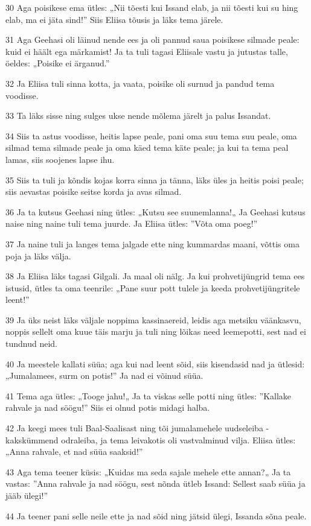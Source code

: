 \par 30 Aga poisikese ema ütles: „Nii tõesti kui Issand elab, ja nii tõesti kui su hing elab, ma ei jäta sind!” Siis Eliisa tõusis ja läks tema järele.
\par 31 Aga Geehasi oli läinud nende ees ja oli pannud saua poisikese silmade peale: kuid ei häält ega märkamist! Ja ta tuli tagasi Eliisale vastu ja jutustas talle, öeldes: „Poisike ei ärganud.”
\par 32 Ja Eliisa tuli sinna kotta, ja vaata, poisike oli surnud ja pandud tema voodisse.
\par 33 Ta läks sisse ning sulges ukse nende mõlema järelt ja palus Issandat.
\par 34 Siis ta astus voodisse, heitis lapse peale, pani oma suu tema suu peale, oma silmad tema silmade peale ja oma käed tema käte peale; ja kui ta tema peal lamas, siis soojenes lapse ihu.
\par 35 Siis ta tuli ja kõndis kojas korra sinna ja tänna, läks üles ja heitis poisi peale; siis aevastas poisike seitse korda ja avas silmad.
\par 36 Ja ta kutsus Geehasi ning ütles: „Kutsu see suunemlanna!„ Ja Geehasi kutsus naise ning naine tuli tema juurde. Ja Eliisa ütles: ”Võta oma poeg!”
\par 37 Ja naine tuli ja langes tema jalgade ette ning kummardas maani, võttis oma poja ja läks välja.
\par 38 Ja Eliisa läks tagasi Gilgali. Ja maal oli nälg. Ja kui prohvetijüngrid tema ees istusid, ütles ta oma teenrile: „Pane suur pott tulele ja keeda prohvetijüngritele leent!”
\par 39 Ja üks neist läks väljale noppima kassinaereid, leidis aga metsiku väänkasvu, noppis sellelt oma kuue täis marju ja tuli ning lõikas need leemepotti, sest nad ei tundnud neid.
\par 40 Ja meestele kallati süüa; aga kui nad leent sõid, siis kisendasid nad ja ütlesid: „Jumalamees, surm on potis!” Ja nad ei võinud süüa.
\par 41 Tema aga ütles: „Tooge jahu!„ Ja ta viskas selle potti ning ütles: ”Kallake rahvale ja nad söögu!” Siis ei olnud potis midagi halba.
\par 42 Ja keegi mees tuli Baal-Saalisast ning tõi jumalamehele uudseleiba - kakskümmend odraleiba, ja tema leivakotis oli vastvalminud vilja. Eliisa ütles: „Anna rahvale, et nad süüa saaksid!”
\par 43 Aga tema teener küsis: „Kuidas ma seda sajale mehele ette annan?„ Ja ta vastas: ”Anna rahvale ja nad söögu, sest nõnda ütleb Issand: Sellest saab süüa ja jääb ülegi!”
\par 44 Ja teener pani selle neile ette ja nad sõid ning jätsid ülegi, Issanda sõna peale.

